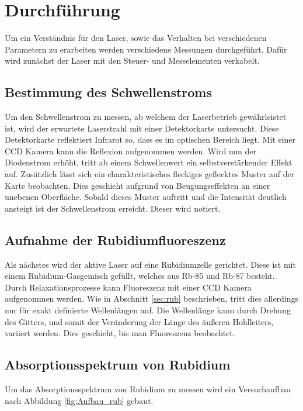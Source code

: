 \chapter{Durchführung}
\label{cha:Durchführung}
Um ein Verständnis für den Laser, sowie das Verhalten bei verschiedenen Parametern zu erarbeiten werden verschiedene Messungen durchgeführt. Dafür wird zunächst der Laser mit den 
Steuer- und Messelementen verkabelt.

\section{Bestimmung des Schwellenstroms}
\label{sec:schwelle}

Um den Schwellenstrom zu messen, ab welchem der Laserbetrieb gewährleistet ist, wird der erwartete Laserstrahl mit einer Detektorkarte untersucht. Diese Detektorkarte reflektiert 
Infrarot so, dass es im optischen Bereich liegt. Mit einer CCD Kamera kann die Reflexion aufgenommen werden. Wird nun der Diodenstrom erhöht, tritt ab einem Schwellenwert
ein selbstverstärkender Effekt auf. Zusätzlich lässt sich ein charakteristisches fleckiges geflecktes Muster auf der Karte beobachten. Dies geschieht aufgrund von Beugungseffekten an einer unebenen Oberfläche.
Sobald dieses Muster auftritt und die Intensität deutlich ansteigt ist der Schwellenstrom erreicht. Dieser wird notiert.

\section{Aufnahme der Rubidiumfluoreszenz}
\label{sec:fluoreszenz}

Als nächstes wird der aktive Laser auf eine Rubidiumzelle gerichtet. Diese ist mit einem Rubidium-Gasgemisch gefüllt, welches aus Rb-85 und Rb-87 besteht. Durch Relaxationsprozesse kann Fluoreszenz mit einer CCD Kamera aufgenommen werden. Wie in Abschnitt \ref{sec:rub}
beschrieben, tritt dies allerdings nur für exakt definierte Wellenlängen auf. Die Wellenlänge kann durch Drehung des Gitters, und somit der Veränderung der Länge des äußeren Hohlleiters, variiert werden. Dies geschieht, bis man Fluoreszenz beobachtet.

\section{Absorptionsspektrum von Rubidium}
\label{sec:abso_rub}

Um das Absorptionsspektrum von Rubidium zu messen wird ein Versuchaufbau nach Abbildung \ref{fig:Aufbau_rub} gebaut.

